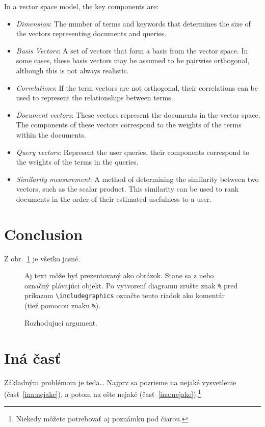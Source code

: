 \documentclass[10pt ,english,a4paper]{article}
\begin{document}
In a vector space model, the key components are:
\begin{itemize}
\item \emph{Dimension}: The number of terms and keywords that determines the size of the vectors representing documents and queries.
\item \emph{Basis Vectors}: A set of vectors that form a basis from the vector space. In some cases, these basis vectors may be assumed to be pairwise orthogonal, although this is not always realistic.
\item \emph{Correlations}: If the term vectors are not orthogonal, their correlations can be used to represent the relationships between terms.
\item \emph{Document vectors}: These vectors represent the documents in the vector space. The components of these vectors correspond to the weights of the terms within the documents.
\item \emph{Query vectors}: Represent the user queries, their components correspond to the weights of the terms in the queries.
\item \emph{Similarity measurement}: A method of determining the similarity between two vectors, such as the scalar product. This similarity can be used to rank documents in the order of their estimated usefulness to a user.
\end{itemize}
\cite{rag86vector}

\section{Conclusion}\label{conclusion}

Z obr.~\ref{f:rozhod} je všetko jasné. 

\begin{figure}[tbh]
\centering
Aj text môže byť prezentovaný ako obrázok. Stane sa z neho označný plávajúci objekt. Po vytvorení diagramu zrušte znak \texttt{\%} pred príkazom \verb|\includegraphics| označte tento riadok ako komentár (tiež pomocou znaku \texttt{\%}).
\caption{Rozhodujuci argument.}
\label{f:rozhod}
\end{figure}



\section{Iná časť} \label{ina}

Základným problémom je teda\ldots{} Najprv sa pozrieme na nejaké vysvetlenie (časť~\ref{ina:nejake}), a potom na ešte nejaké (časť~\ref{ina:nejake}).\footnote{Niekedy môžete potrebovať aj poznámku pod čiarou.}
\end{document}
